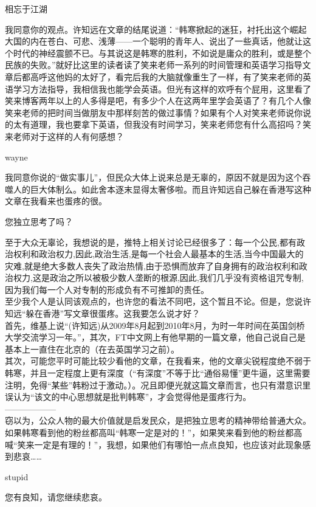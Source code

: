 相忘于江湖

我同意你的观点。许知远在文章的结尾说道：``韩寒掀起的迷狂，衬托出这个崛起大国的内在苍白、可悲、浅薄------一个聪明的青年人、说出了一些真话，他就让这个时代的神经震颤不已。与其说这是韩寒的胜利，不如说是庸众的胜利，或是整个民族的失败。''就好比这里的读者读了笑来老师一系列的时间管理和英语学习指导文章后都高呼这他妈的太好了，看完后我的大脑就像重生了一样，有了笑来老师的英语学习方法指导，我相信我也能学会英语。但光有这样的欢呼有个屁用，这里看了笑来博客两年以上的人多得是吧，有多少个人在这两年里学会英语了？有几个人像笑来老师的把时间当做朋友中那样刻苦的做过事情？如果有个人对笑来老师说你说的太有道理，我也要拿下英语，但我没有时间学习，笑来老师您有什么高招吗？笑来老师对于这样的人有何感想？

wayne

我同意你说的``做实事儿''，但民众大体上说来总是无辜的，原因不就是因为这个吞噬人的巨大体制么。如此舍本逐末显得太奢侈啦。而且许知远自己躲在香港写这种文章在我看来也蛋疼的很。

您独立思考了吗？

至于大众无辜论，我想说的是，推特上相关讨论已经很多了：每一个公民,都有政治权利和政治权力,因此,政治生活,是每一个社会人最基本的生活,当今中国最大的灾难,就是绝大多数人丧失了政治热情,由于恐惧而放弃了自身拥有的政治权利和政治权力,这是政治之所以被极少数人垄断的根源,因此,我们几乎没有资格诅咒专制,因为我们每一个人对专制的形成负有不可推卸的责任。\\
至少我个人是认同该观点的，也许您的看法不同吧，这个暂且不论。但是，您说许知远``躲在香港''写文章很蛋疼。这我要怎么说才好？\\
首先，维基上说``(许知远)从2009年8月起到2010年8月，为时一年时间在英国剑桥大学交流学习一年。''，其次，FT中文网上有他早期的一篇文章，他自己说自己是基本上一直住在北京的（在去英国学习之前）。\\
其次，可能您平时可能比较少看他的文章，在我看来，他的文章尖锐程度绝不弱于韩寒，并且一定程度上更有深度（``有深度''不等于比``通俗易懂''更牛逼，这里需要注明，免得``某些''韩粉过于激动。）。况且即便光就这篇文章而言，也只有潜意识里误认为``该文的中心思想就是批判韩寒''，才会觉得他是蛋疼行为。\\
------------------\\
窃以为，公众人物的最大价值就是启发民众，是把独立思考的精神带给普通大众。如果韩寒看到他的粉丝都高叫``韩寒一定是对的！''，如果笑来看到他的粉丝都高喊``笑来一定是有理的！''，我想，如果他们有哪怕一点点良知，也应该对此现象感到悲哀\ldots{}\ldots{}

stupid

您有良知，请您继续悲哀。

